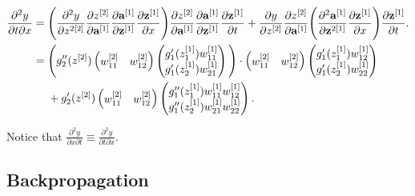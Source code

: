 \documentclass{article}
\begin{document}
\begin{align}
\frac{\partial^2 y}{\partial t \partial x} &= \Bigg{(} \frac{\partial^2 y}{\partial z^{2{[2]}}} \frac{\partial z^{[2]}}{\partial \textbf{a}^{[1]}} \frac{\partial \textbf{a}^{[1]}}{\partial \textbf{z}^{[1]}} \frac{\partial \textbf{z}^{[1]}}{\partial x} \Bigg{)} \frac{\partial z^{[2]}}{\partial \textbf{a}^{[1]}} \frac{\partial \textbf{a}^{[1]}}{\partial \textbf{z}^{[1]}}  \frac{\partial \textbf{z}^{[1]}}{\partial t} + 
\frac{\partial y}{\partial z^{[2]}} \frac{\partial z^{[2]}}{\partial \textbf{a}^{[1]}} \Bigg{(} \frac{\partial^2 \textbf{a}^{[1]}}{\partial \textbf{z}^{2{[1]}}}  \frac{\partial \textbf{z}^{[1]}}{\partial x} \Bigg{)}  \frac{\partial \textbf{z}^{[1]}}{\partial t}. \\
&=\Bigg{(} g_2''(z^{[2]}) 
\begin{pmatrix}
w_{11}^{[2]} & w_{12}^{[2]} 
\end{pmatrix}
\begin{pmatrix}
g_1'(z_1^{[1]}) w_{11}^{[1]} \\
g_1'(z_2^{[1]}) w_{21}^{[1]}
\end{pmatrix}
\Bigg{)}\cdot 
\begin{pmatrix}
w_{11}^{[2]} & w_{12}^{[2]} 
\end{pmatrix}
\begin{pmatrix}
g_1'(z_1^{[1]}) w_{12}^{[1]} \\
g_1'(z_2^{[1]}) w_{22}^{[1]}
\end{pmatrix}
\\
&~~~~ +g_2'(z^{[2]})
\begin{pmatrix}
w_{11}^{[2]} & w_{12}^{[2]} 
\end{pmatrix}
\begin{pmatrix}
g_1''(z_1^{[1]}) w_{11}^{[1]} w_{12}^{[1]}  \\
g_1''(z_2^{[1]}) w_{21}^{[1]} w_{22}^{[1]}  \\
\end{pmatrix}.
\label{dy2dxdtlongmat} 
\end{align}

Notice that $\frac{\partial^2 y}{\partial x \partial t} \equiv \frac{\partial^2 y}{\partial t \partial x}$. 


\subsection{Backpropagation}
\end{document}
